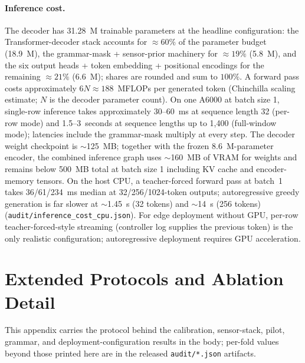 \documentclass[sensors,article,submit,moreauthors,pdftex]{Definitions/mdpi}
\begin{document}
\paragraph{Inference cost.}
\label{app3:repro-inference}
The decoder has 31.28~M trainable parameters at the headline configuration: the Transformer-decoder stack
accounts for $\approx\!60\%$ of the parameter budget (18.9~M), the grammar-mask + sensor-prior machinery for
$\approx\!19\%$ (5.8~M), and the six output heads + token embedding + positional encodings for the remaining
$\approx\!21\%$ (6.6~M); shares are rounded and sum to $100\%$. A forward pass costs approximately $6N \approx
188$~MFLOPs per generated token (Chinchilla scaling estimate; $N$ is the decoder parameter count). On one
A6000 at batch size 1, single-row inference takes approximately 30--60~ms at sequence length 32 (per-row mode)
and 1.5--3~seconds at sequence lengths up to 1{,}400 (full-window mode); latencies include the grammar-mask
multiply at every step. The decoder weight checkpoint is $\sim$125~MB; together with the frozen
8.6~M-parameter encoder, the combined inference graph uses $\sim$160~MB of VRAM for weights and remains below
500~MB total at batch size 1 including KV cache and encoder-memory tensors. On the host CPU, a teacher-forced forward pass at batch~1 takes 36/61/234~ms median at 32/256/1024-token outputs; autoregressive greedy generation is far slower at $\sim$1.45~s (32 tokens) and $\sim$14~s (256 tokens) (\texttt{audit/\allowbreak inference\_cost\_cpu.json}). For edge deployment without GPU, per-row teacher-forced-style streaming (controller log supplies the previous token) is the only realistic configuration; autoregressive deployment requires GPU acceleration.

\section{Extended Protocols and Ablation Detail}
\label{app3:protocol}

This appendix carries the protocol behind the calibration, sensor-stack, pilot, grammar, and deployment-configuration results in the body; per-fold values beyond those printed here are in the released \texttt{audit/*.json} artifacts.
\end{document}
